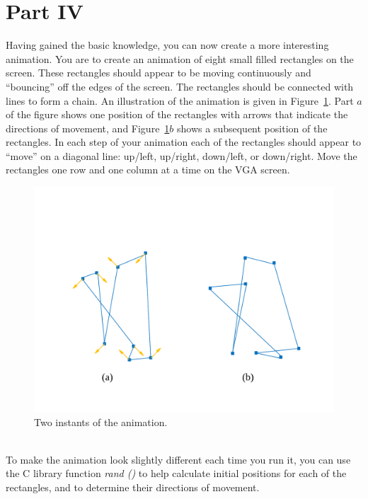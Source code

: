 \documentclass[epsfig,10pt,fullpage]{article}
\begin{document}
\noindent
\section*{Part IV}

\noindent
Having gained the basic knowledge, you can now create a more interesting animation.
You are to create an animation of eight small filled rectangles on the screen. These rectangles 
should appear to be moving continuously and ``bouncing'' off the edges of the screen. The 
rectangles should be connected with lines to form a chain. An illustration of the animation 
is given in Figure~\ref{fig:animation_example}. Part $a$ of the figure shows one position
of the rectangles with arrows that indicate the directions of movement, and 
Figure~\ref{fig:animation_example}$b$ shows a subsequent position of the rectangles. 
In each step of your animation each of the rectangles should appear to ``move'' on a diagonal 
line: up/left, up/right, down/left, or down/right. Move the rectangles one
row and one column at a time on the VGA screen.

\begin{figure}[h!]
   \begin{center}
       \includegraphics[scale = 0.5]{figures/fig_animation_example.pdf}
   \end{center}
	\vspace{-0.5cm}
   \caption{Two instants of the animation.}
	\label{fig:animation_example}
\end{figure}

~\\
\noindent
To make the animation look slightly different each time you run it, you can use the C library
function {\it rand ()} to help calculate initial positions for each of the rectangles, and to
determine their directions of movement. 
\end{document}
